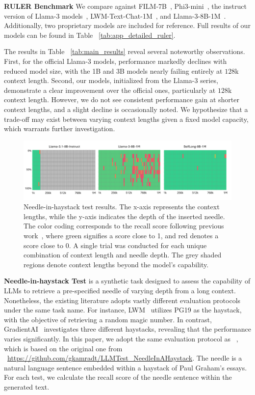 \documentclass{article}
\begin{document}
\noindent
\textbf{RULER Benchmark }
We compare against FILM-7B~\citep{an2024make}, Phi3-mini~\citep{abdin2024phi},
the instruct version of Llama-3 models~\citep{dubey2024llama},
LWM-Text-Chat-1M~\citep{liu2024world}, and Llama-3-8B-1M~\citep{gradientlongcontextllama3}.
Additionally,
two proprietary models are included for reference.
Full results of our models can be found in Table ~\ref{tab:app_detailed_ruler}.

The results in Table ~\ref{tab:main_results} reveal several noteworthy observations.
First,
for the official Llama-3 models,
performance markedly declines with reduced model size,
with the 1B and 3B models nearly failing entirely at $128$k context length.
Second,
our models,
initialized from the Llama-3 series,
demonstrate a clear improvement over the official ones,
particularly at $128$k context length.
However,
we do not see consistent performance gain at shorter context lengths,
and a slight decline is occasionally noted.
We hypothesize that a trade-off may exist between varying context lengths given a fixed model capacity,
which warrants further investigation.

\begin{figure}[ht]
\centering
\includegraphics[width=1.0\textwidth]{needle_results.pdf}
\caption{Needle-in-haystack test results.
The x-axis represents the context lengths,
while the y-axis indicates the depth of the inserted needle.
The color coding corresponds to the recall score following previous work~\citep{fu2024data},
where green signifies a score close to 1, and red denotes a score close to 0.
A single trial was conducted for each unique combination of context length and needle depth.
The grey shaded regions denote context lengths beyond the model's capability.}
\label{fig:needle_results}
\end{figure}

\noindent
\textbf{Needle-in-haystack Test }
is a synthetic task designed to assess the capability of LLMs to retrieve a pre-specified needle of varying depth from a long context.
Nonetheless,
the existing literature adopts vastly different evaluation protocols under the same task name.
For instance,
LWM~\citep{liu2024world} utilizes PG19 as the haystack,
with the objective of retrieving a random magic number.
In contrast,
GradientAI~\citep{gradientlongcontextllama3} investigates three different haystacks,
revealing that the performance varies significantly.
In this paper,
we adopt the same evaluation protocol as ~\citeauthor{fu2024data},
which is based on the original one from ~\url{https://github.com/gkamradt/LLMTest_NeedleInAHaystack}.
The needle is a natural language sentence embedded within a haystack of Paul Graham's essays.
For each test,
we calculate the recall score of the needle sentence within the generated text.
\end{document}
